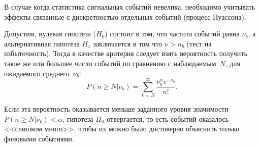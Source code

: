 В случае когда статистика сигнальных событий невелика, необходимо
учитывать эффекты связанные с дискретностью отдельных
событий (процесс Пуассона).

\begin{comment}
В частности, \eqref{eq:cls-definition} значит, что даже
в случае отсутствия ожидаемых фоновых событий в сигнальной
области~($\nu_b = 0$),
любая гипотеза предсказывающая число событий меньшее
$- \text{ln} ~\alpha$ будет отвергнута. Для некоторых
значений $\alpha$ минимальное
число событий приведено в таблице~\ref{tab:cls-alpha-examples}.
\begin{table}[ht]
    \centering
    \begin{tabular}{r|c}
        $\alpha$ & $s$ \\ \hline
        $0{,}1$ & $2{,}3$ \\
        $0{,}01$ & $4{,}6$ \\
        $1-\text{erfc}(5\sigma)$ & $15{,}0$
    \end{tabular}
    \caption{Минимальное число событий для различных $\alpha$}
    \label{tab:cls-alpha-examples}
\end{table}
\end{comment}

Допустим, нулевая гипотеза ($H_0$) состоит в том,
что частота событий равна $\nu_b$, а альтернативная
гипотеза $H_1$ заключается в том что $\nu > n_b$
(тест на избыточность).
Тогда в качестве критерия следует взять вероятность получить
такое же или большее число событий по сравнению с
наблюдаемым~$N$, для ожидаемого среднего~$\nu_b$:
\begin{equation}
    P(n \ge N|\nu_b) = \sum\limits_{k=N}^{\infty} \frac{\nu_b^n e^{-\nu_b}}{n!}.
    \label{eq:poisson-no-bg}
\end{equation}

Если эта вероятность оказывается меньше заданного
уровня значимости $P(n \ge N|\nu_b) < \alpha$, гипотеза $H_0$ отвергается,
то есть событий оказалось <<слишком много>>, чтобы их можно было достоверно
объяснить только фоновыми событиями.

%
%

